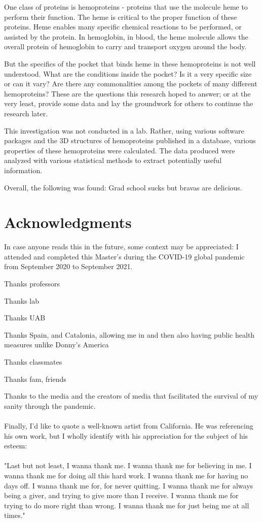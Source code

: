 \documentclass[12pt,oneside,a4paper]{report}
\begin{document}
		One class of proteins is hemoproteins - proteins that use the molecule heme to perform their function. The heme is critical to the proper function of these proteins. Heme enables many specific chemical reactions to be performed, or assisted by the protein. In hemoglobin, in blood, the heme molecule allows the overall protein of hemoglobin to carry and transport oxygen around the body.
		
		But the specifics of the pocket that binds heme in these hemoproteins is not well understood. What are the conditions inside the pocket? Is it a very specific size or can it vary? Are there any commonalities among the pockets of many different hemoproteins? These are the questions this research hoped to answer; or at the very least, provide some data and lay the groundwork for others to continue the research later.
		
		This investigation was not conducted in a lab. Rather, using various software packages and the 3D structures of hemoproteins published in a database, various properties of these hemoproteins were calculated. The data produced were analyzed with various statistical methods to extract potentially useful information.
		
		Overall, the following was found:
		Grad school sucks but bravas are delicious.
	
	\chapter*{Acknowledgments}
	
		In case anyone reads this in the future, some context may be appreciated: I attended and completed this Master's during the COVID-19 global pandemic from September 2020 to September 2021.
		
		Thanks professors
		
		Thanks lab
		
		Thanks UAB
		
		Thanks Spain, and Catalonia, allowing me in and then also having public health measures unlike Donny's America
		
		Thanks classmates
		
		Thanks fam, friends
		
		Thanks to the media and the creators of media that facilitated the survival of my sanity through the pandemic.
		\\~\\
		Finally, I'd like to quote a well-known artist from California. He was referencing his own work, but I wholly identify with his appreciation for the subject of his esteem:
		\\~\\
		"Last but not least, I wanna thank me. I wanna thank me for believing in me. I wanna thank me for doing all this hard work. I wanna thank me for having no days off. I wanna thank me for, for never quitting. I wanna thank me for always being a giver, and trying to give more than I receive. I wanna thank me for trying to do more right than wrong. I wanna thank me for just being me at all times."
		
\end{document}
